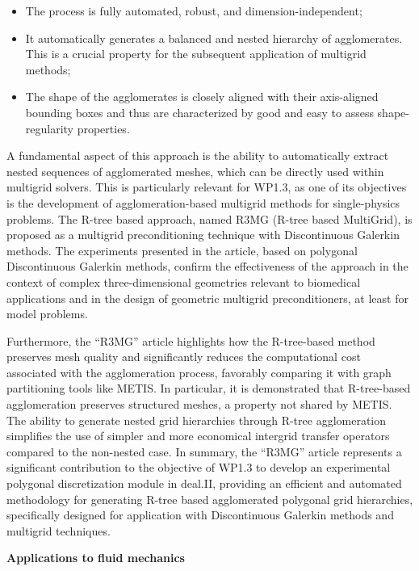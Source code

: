 \documentclass[a4paper,12pt, numbers]{article}
\begin{document}
\begin{itemize}
\item The process is fully automated, robust, and dimension-independent;
\item It automatically generates a balanced and nested hierarchy of agglomerates. This is a crucial property for
the subsequent application of multigrid methods;
\item The shape of the agglomerates is closely aligned with their axis-aligned bounding boxes and thus are characterized by good and easy to assess shape-regularity properties.
\end{itemize}

A fundamental aspect of this approach is the ability to automatically extract
nested sequences of agglomerated meshes, which can be directly used within
multigrid solvers. This is particularly relevant for WP1.3, as one of its
objectives is the development of agglomeration-based multigrid methods for
single-physics problems. The R-tree based approach, named R3MG (R-tree based
MultiGrid), is proposed as a multigrid preconditioning technique with
Discontinuous Galerkin methods. The experiments presented in the article, based
on polygonal Discontinuous Galerkin methods, confirm the effectiveness of the
approach in the context of complex three-dimensional geometries relevant to biomedical applications and in the
design of geometric multigrid preconditioners, at least for model problems.

Furthermore, the ``R3MG'' article highlights how the R-tree-based method preserves
mesh quality and significantly reduces the computational cost associated with
the agglomeration process, favorably comparing it with graph partitioning tools
like METIS. In particular, it is demonstrated that R-tree-based agglomeration
preserves structured meshes, a property not shared by METIS. The ability to
generate nested grid hierarchies through R-tree agglomeration simplifies the use
of simpler and more economical intergrid transfer operators compared to the
non-nested case. In summary, the ``R3MG'' article represents a significant
contribution to the objective of WP1.3 to develop an experimental polygonal
discretization module in deal.II, providing an efficient and automated
methodology for generating R-tree based agglomerated polygonal grid hierarchies,
specifically designed for application with Discontinuous Galerkin methods and
multigrid techniques.

\noindent\textbf{Applications to fluid mechanics}
\end{document}
